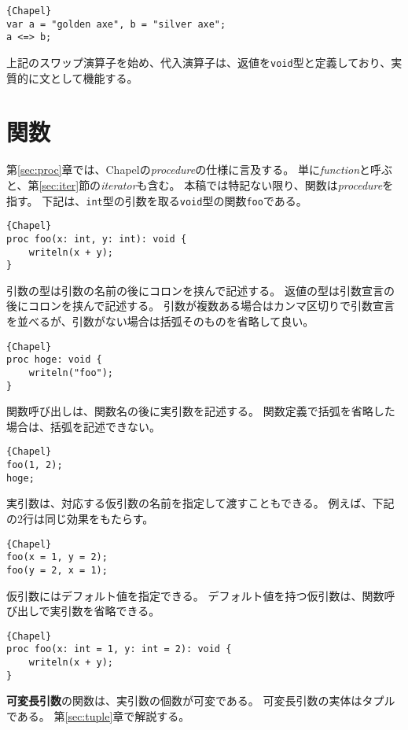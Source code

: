 \documentclass[10pt,a4paper]{book}
\begin{document}
\begin{Verbatim}{Chapel}
var a = "golden axe", b = "silver axe";
a <=> b;
\end{Verbatim}

上記のスワップ演算子を始め、代入演算子は、返値を\verb#void#型と定義しており、実質的に文として機能する。

\chapter{関数\label{sec:proc}}

第\ref{sec:proc}章では、Chapelの\textit{procedure}の仕様に言及する。
単に\textit{function}と呼ぶと、第\ref{sec:iter}節の\textit{iterator}も含む。
本稿では特記ない限り、関数は\textit{procedure}を指す。
下記は、\verb#int#型の引数を取る\verb#void#型の関数\verb#foo#である。

\begin{Verbatim}{Chapel}
proc foo(x: int, y: int): void {
	writeln(x + y);
}
\end{Verbatim}

引数の型は引数の名前の後にコロンを挟んで記述する。
返値の型は引数宣言の後にコロンを挟んで記述する。
引数が複数ある場合はカンマ区切りで引数宣言を並べるが、引数がない場合は括弧そのものを省略して良い。

\begin{Verbatim}{Chapel}
proc hoge: void {
	writeln("foo");
}
\end{Verbatim}

関数呼び出しは、関数名の後に実引数を記述する。
関数定義で括弧を省略した場合は、括弧を記述できない。

\begin{Verbatim}{Chapel}
foo(1, 2);
hoge;
\end{Verbatim}

実引数は、対応する仮引数の名前を指定して渡すこともできる。
例えば、下記の2行は同じ効果をもたらす。

\begin{Verbatim}{Chapel}
foo(x = 1, y = 2);
foo(y = 2, x = 1);
\end{Verbatim}

仮引数にはデフォルト値を指定できる。
デフォルト値を持つ仮引数は、関数呼び出しで実引数を省略できる。

\begin{Verbatim}{Chapel}
proc foo(x: int = 1, y: int = 2): void {
	writeln(x + y);
}
\end{Verbatim}

\textbf{可変長引数}の関数は、実引数の個数が可変である。
可変長引数の実体はタプルである。
第\ref{sec:tuple}章で解説する。
\end{document}
